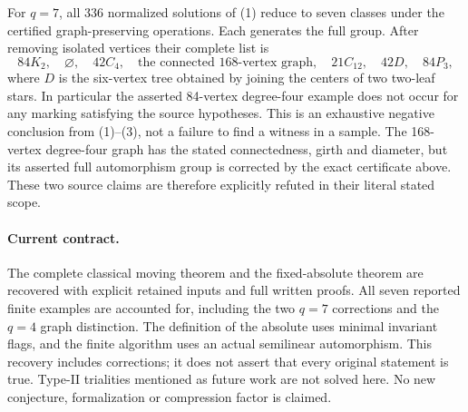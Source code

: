 \documentclass[11pt,a4paper]{article}
\begin{document}
For $q=7$, all 336 normalized solutions of (1) reduce to seven classes
under the certified graph-preserving operations. Each generates the full
group. After removing isolated vertices their complete list is
\[
84K_2,\quad\varnothing,\quad42C_4,\quad
\text{the connected 168-vertex graph},\quad21C_{12},\quad
42D,\quad84P_3,                                             \tag{3}
\]
where $D$ is the six-vertex tree obtained by joining the centers of two
two-leaf stars. In particular the asserted 84-vertex degree-four example
does not occur for any marking satisfying the source hypotheses. This
is an exhaustive negative conclusion from (1)--(3), not a failure to find
a witness in a sample. The 168-vertex degree-four graph has the stated
connectedness, girth and diameter, but its asserted full automorphism
group is corrected by the exact certificate above. These two source
claims are therefore explicitly refuted in their literal stated scope.

\paragraph{Current contract.}
The complete classical moving theorem and the fixed-absolute theorem
are recovered with explicit retained inputs and full written proofs.
All seven reported finite examples are accounted for, including the
two $q=7$ corrections and the $q=4$ graph distinction. The definition of
the absolute uses minimal invariant flags, and the finite algorithm uses
an actual semilinear automorphism. This recovery includes corrections;
it does not assert that every original statement is true. Type-II
trialities mentioned as future work are not solved here. No new
conjecture, formalization or compression factor is claimed.
\end{document}
